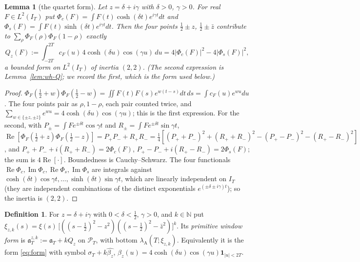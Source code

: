\documentclass[11pt]{amsart}
\newtheorem{lemma}[theorem]{Lemma}
\theoremstyle{definition}
\newtheorem{definition}[theorem]{Definition}
\theoremstyle{remark}
\newcommand{\N}{\mathbb N}
\newcommand{\Rel}{\operatorname{Re}}
\newcommand{\Iml}{\operatorname{Im}}
\newcommand{\PT}{\mathcal P_T}
\newcommand{\IT}{I_T}
\newcommand{\sT}{\sigma_T}
\newcommand{\cF}{c_F}
\begin{document}
\begin{lemma}[the quartet form]\label{lem:quartet}
Let $z=\delta+i\gamma$ with $\delta>0$, $\gamma>0$. For real $F\in L^2(\IT)$ put
$\Phi_c(F)=\int F(t)\cosh(\delta t)e^{i\gamma t}dt$ and $\Phi_s(F)=\int F(t)\sinh(\delta t)e^{i\gamma t}dt$. Then
the four points $\frac12\pm z$, $\frac12\pm\bar z$ contribute to $\sum_\rho\Phi_F(\rho)\Phi_F(1-\rho)$ exactly
\[
Q_z(F):=\int_{-2T}^{2T}\cF(u)\,4\cosh(\delta u)\cos(\gamma u)\,du=4|\Phi_c(F)|^2-4|\Phi_s(F)|^2 ,
\]
a bounded form on $L^2(\IT)$ of inertia $(2,2)$. (The second expression is Lemma~\ref{lem:wh-Q}; we record the first, which is the form used below.)
\end{lemma}
\begin{proof}
$\Phi_F(\frac12+w)\Phi_F(\frac12-w)=\iint F(t)F(s)e^{w(t-s)}dt\,ds=\int\cF(u)e^{wu}du$. The four points pair as
$\rho,1-\rho$, each pair counted twice, and $\sum_{w\in\{\pm z,\pm\bar z\}}e^{wu}=4\cosh(\delta u)\cos(\gamma u)$; this is
the first expression. For the second, with $P_\pm=\int Fe^{\pm\delta t}\cos\gamma t$ and $R_\pm=\int Fe^{\pm\delta t}\sin\gamma t$,
$\Rel[\Phi_F(\frac12+z)\Phi_F(\frac12-z)]=P_+P_-+R_+R_-=\frac14[(P_++P_-)^2+(R_++R_-)^2-(P_+-P_-)^2-(R_+-R_-)^2]$, and
$P_++P_-+i(R_++R_-)=2\Phi_c(F)$, $P_+-P_-+i(R_+-R_-)=2\Phi_s(F)$; the sum is $4\Rel[\cdot]$. Boundedness is
Cauchy--Schwarz. The four functionals $\Rel\Phi_c,\Iml\Phi_c,\Rel\Phi_s,\Iml\Phi_s$ are integrals against
$\cosh(\delta t)\cos\gamma t,\dots,\sinh(\delta t)\sin\gamma t$, which are linearly independent on $\IT$ (they are
independent combinations of the distinct exponentials $e^{(\pm\delta\pm i\gamma)t}$); so the inertia is $(2,2)$.
\end{proof}

\begin{definition}\label{def:quartetmodel}
For $z=\delta+i\gamma$ with $0<\delta<\frac12$, $\gamma>0$, and $k\in\N$ put
$\xi_{z,k}(s)=\xi(s)\,\big[((s-\frac12)^2-z^2)((s-\frac12)^2-\bar z^2)\big]^k$. Its \emph{primitive window form} is
$\mathfrak a^{z,k}_T:=\mathfrak a_T+kQ_z$ on $\PT$, with bottom $\lambda_{\mathrm A}(T;\xi_{z,k})$. Equivalently it is
the form \eqref{eq:form} with symbol $\sT+k\widehat{\beta_z}$, $\beta_z(u)=4\cosh(\delta u)\cos(\gamma u)\mathbf 1_{|u|<2T}$.
\end{definition}
\end{document}

